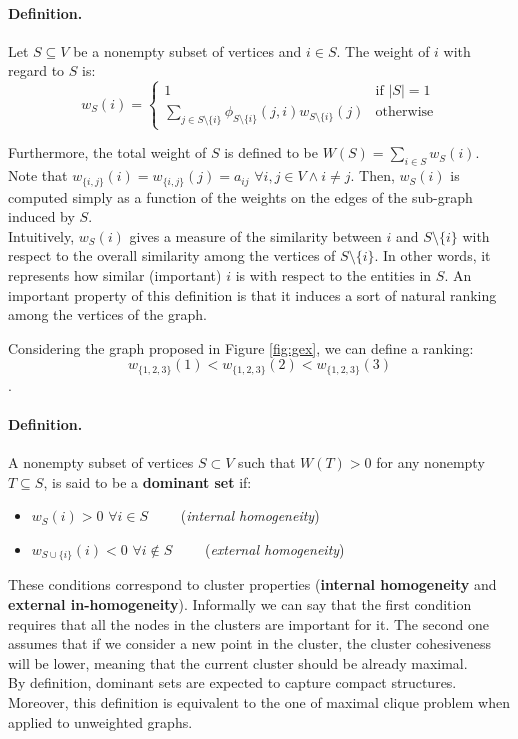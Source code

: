 \paragraph{Definition.} Let $S\subseteq V$ be a nonempty subset of vertices and $i \in S$. The weight of $i$ with regard to $S$ is:
\begin{equation}
  w_S(i)= \begin{cases}
      1 & \text{if } |S| = 1 \\
      \sum\limits_{j\in S\setminus \{i\}}\phi_{S\setminus \{i\}}(j, i)w_{S\setminus \{i\}}(j) & \text{otherwise}
  \end{cases}
\end{equation}

Furthermore, the total weight of $S$ is defined to be $W(S)=\sum_{i\in S}w_S(i)$.
Note that $w_{\{i, j\}}(i)=w_{\{i, j\}}(j)=a_{ij}$ $\forall i, j \in V \land i\neq j$. Then, $w_S(i)$ is computed simply as a function of the weights on the edges of the sub-graph induced by $S$.\\

Intuitively, $w_S(i)$ gives a measure of the similarity between $i$ and $S\setminus \{i\}$ with respect to the overall similarity among the vertices of $S\setminus \{i\}$. In other words, it represents how similar (important) $i$ is with respect to the entities in $S$.
An important property of this definition is that it induces a sort of natural ranking among the vertices of the graph. 



Considering the graph proposed in Figure \ref{fig:gex}, we can define a ranking: $$w_{\{1,2,3\}}(1) < w_{\{1,2,3\}}(2) < w_{\{1,2,3\}}(3)$$.

\paragraph{Definition.} A nonempty subset of vertices $S\subset V$ such that $W(T)>0$ for any nonempty $T \subseteq S$, is said to be a \textbf{dominant set} if:
\begin{itemize}
  \item $w_S(i) > 0$ $\forall i \in S \qquad$ (\textit{internal homogeneity})
  \item $w_{S \cup \{i\}}(i) < 0$ $\forall i \notin S \qquad$ (\textit{external homogeneity})
\end{itemize}
These conditions correspond to cluster properties (\textbf{internal homogeneity} and \textbf{external in-homogeneity}). Informally we can say that the first condition requires that all the nodes in the clusters are important for it. The second one assumes that if we consider a new point in the cluster, the cluster cohesiveness will be lower, meaning that the current cluster should be already maximal.\\
By definition, dominant sets are expected to capture compact structures. Moreover, this definition is equivalent to the one of maximal clique problem when applied to unweighted graphs.


